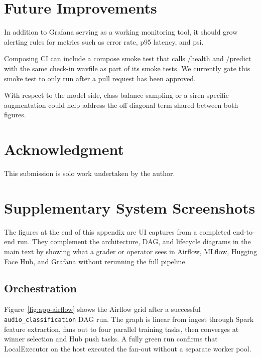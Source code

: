 \documentclass[conference]{IEEEtran}
\begin{document}
\section{Future Improvements}
\label{sec:future}

In addition to Grafana serving as a working monitoring tool, it should grow alerting rules for metrics such as error rate, p95 latency, and psi.

Composing CI can include a compose smoke test that calls /health and /predict with the same check-in wavfile as part of its smoke tests. We currently gate this smoke test to only run after a pull request has been approved.

With respect to the model side, class-balance sampling or a siren specific augmentation could help address the off diagonal term shared between both figures.

\section*{Acknowledgment}
This submission is solo work undertaken by the author.




\clearpage
\onecolumn
\appendices
\section{Supplementary System Screenshots}
\label{app:screenshots}

The figures at the end of this appendix are UI captures from a completed end-to-end run.
They complement the architecture, DAG, and lifecycle diagrams in the main text by showing what a grader or operator sees in Airflow, MLflow, Hugging Face Hub, and Grafana without rerunning the full pipeline.

\subsection{Orchestration}
Figure~\ref{fig:app-airflow} shows the Airflow grid after a successful \texttt{audio\_classification} DAG run.
The graph is linear from ingest through Spark feature extraction, fans out to four parallel training tasks, then converges at winner selection and Hub push tasks.
A fully green run confirms that LocalExecutor on the host executed the fan-out without a separate worker pool.
\end{document}

